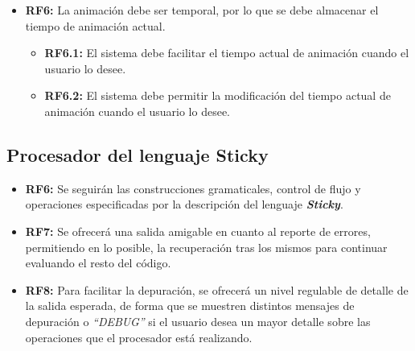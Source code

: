 \begin{itemize}
         \item \textbf{RF6:} La animación debe ser temporal, por lo que se debe almacenar el tiempo de animación actual.
               \begin{itemize}
                  \item \textbf{RF6.1:} El sistema debe facilitar el tiempo actual de animación cuando el usuario lo desee.
                  \item \textbf{RF6.2:} El sistema debe permitir la modificación del tiempo actual de animación cuando el usuario lo desee.
               \end{itemize}
         \end{itemize}

      \subsection{Procesador del lenguaje Sticky}
      \begin{itemize}
         \item \textbf{RF6:} Se seguirán las construcciones gramaticales, control de flujo y operaciones especificadas por la descripción
               del lenguaje \textbf{\textit{Sticky}}.
         \item \textbf{RF7:} Se ofrecerá una salida amigable en cuanto al reporte de errores, permitiendo en lo posible, la recuperación
               tras los mismos para continuar evaluando el resto del código.
         \item \textbf{RF8:} Para facilitar la depuración, se ofrecerá un nivel regulable de detalle de la salida esperada, de forma que
               se muestren distintos mensajes de depuración o \textit{``DEBUG''} si el usuario desea un mayor detalle sobre las operaciones
               que el procesador está realizando.
      \end{itemize}

